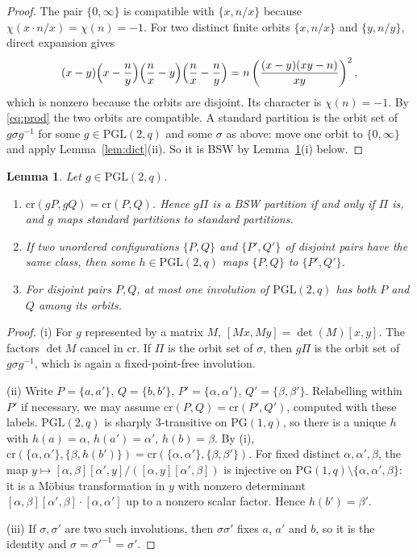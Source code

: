 \documentclass[11pt,a4paper]{article}
\newtheorem{lemma}[theorem]{Lemma}
\theoremstyle{definition}
\theoremstyle{remark}
\newcommand{\PG}{\mathrm{PG}}
\newcommand{\PGL}{\mathrm{PGL}}
\newcommand{\cro}{\mathrm{cr}}
\begin{document}
\begin{proof}
The pair $\{0,\infty\}$ is compatible with $\{x,n/x\}$ because $\chi(x\cdot n/x)=\chi(n)=-1$. For two distinct finite
orbits $\{x,n/x\}$ and $\{y,n/y\}$, direct expansion gives
\[
(x-y)\Bigl(x-\frac ny\Bigr)\Bigl(\frac nx-y\Bigr)\Bigl(\frac nx-\frac ny\Bigr)
=n\left(\frac{(x-y)(xy-n)}{xy}\right)^{2},
\]
which is nonzero because the orbits are disjoint. Its character is $\chi(n)=-1$. By \eqref{eq:prod} the two
orbits are compatible. A standard partition is the orbit set of $g\sigma g^{-1}$ for some $g\in\PGL(2,q)$ and
some $\sigma$ as above: move one orbit to $\{0,\infty\}$ and apply Lemma~\ref{lem:dict}(ii). So it is BSW by
Lemma~\ref{lem:pgl}(i) below.
\end{proof}

\begin{lemma}\label{lem:pgl}
Let $g\in\PGL(2,q)$.
\begin{enumerate}
\item[(i)] $\cro(gP,gQ)=\cro(P,Q)$. Hence $g\Pi$ is a BSW partition if and only if $\Pi$ is, and $g$ maps
standard partitions to standard partitions.
\item[(ii)] If two unordered configurations $\{P,Q\}$ and $\{P',Q'\}$ of disjoint pairs have the same class,
then some $h\in\PGL(2,q)$ maps $\{P,Q\}$ to $\{P',Q'\}$.
\item[(iii)] For disjoint pairs $P,Q$, at most one involution of $\PGL(2,q)$ has both $P$ and $Q$ among its orbits.
\end{enumerate}
\end{lemma}

\begin{proof}
(i) For $g$ represented by a matrix $M$, $[Mx,My]=\det(M)[x,y]$. The factors $\det M$ cancel in $\cro$. If
$\Pi$ is the orbit set of $\sigma$, then $g\Pi$ is the orbit set of $g\sigma g^{-1}$, which is again a
fixed-point-free involution.

(ii) Write $P=\{a,a'\}$, $Q=\{b,b'\}$, $P'=\{\alpha,\alpha'\}$, $Q'=\{\beta,\beta'\}$. Relabelling within $P'$
if necessary, we may assume $\cro(P,Q)=\cro(P',Q')$, computed with these labels. $\PGL(2,q)$ is sharply
$3$-transitive on $\PG(1,q)$, so there is a unique $h$ with $h(a)=\alpha$, $h(a')=\alpha'$, $h(b)=\beta$. By
(i), $\cro(\{\alpha,\alpha'\},\{\beta,h(b')\})=\cro(\{\alpha,\alpha'\},\{\beta,\beta'\})$. For fixed distinct
$\alpha,\alpha',\beta$, the map $y\mapsto [\alpha,\beta][\alpha',y]/([\alpha,y][\alpha',\beta])$ is injective
on $\PG(1,q)\setminus\{\alpha,\alpha',\beta\}$: it is a M\"obius transformation in $y$ with nonzero determinant
$[\alpha,\beta][\alpha',\beta]\cdot[\alpha,\alpha']$ up to a nonzero scalar factor. Hence $h(b')=\beta'$.

(iii) If $\sigma,\sigma'$ are two such involutions, then $\sigma\sigma'$ fixes $a$, $a'$ and $b$, so it is the
identity and $\sigma=\sigma'^{-1}=\sigma'$.
\end{proof}
\end{document}
